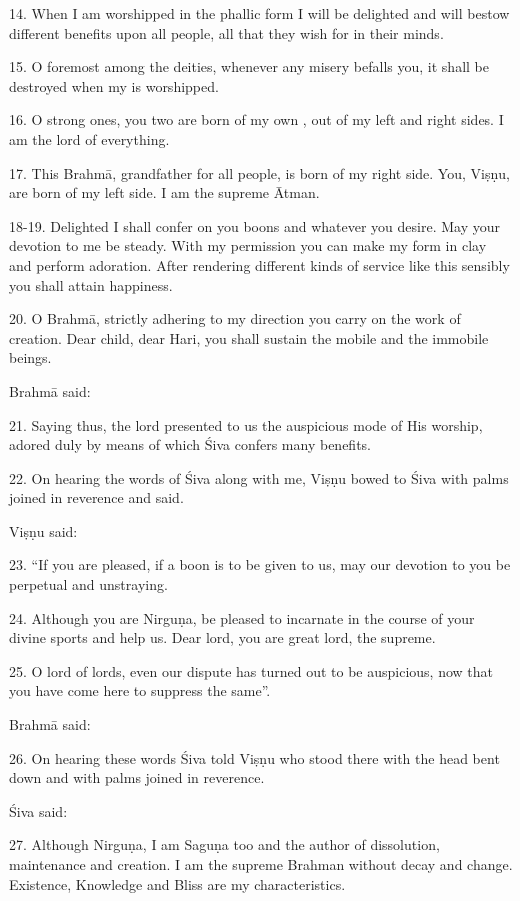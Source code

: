 14. When I am worshipped in the phallic form I will be delighted and will bestow
different benefits upon all people, all that they wish for in their minds.

15. O foremost among the deities, whenever any misery befalls you, it shall be
destroyed when my  is worshipped.

16. O strong ones, you two are born of my own , out of my left and
right sides. I am the lord of everything.

17. This Brahmā, grandfather for all people, is born of my right side. You,
Viṣṇu, are born of my left side. I am the supreme Ātman.

18-19. Delighted I shall confer on you boons and whatever you desire. May your
devotion to me be steady. With my permission you can make my form in clay and
perform adoration. After rendering different kinds of service like this sensibly
you shall attain happiness.

20. O Brahmā, strictly adhering to my direction you carry on the work of
creation. Dear child, dear Hari, you shall sustain the mobile and the immobile
beings.

Brahmā said:

21. Saying thus, the lord presented to us the auspicious mode of His worship,
adored duly by means of which Śiva confers many benefits.

22. On hearing the words of Śiva along with me, Viṣṇu bowed to Śiva with palms
joined in reverence and said.

Viṣṇu said:

23. “If you are pleased, if a boon is to be given to us, may our devotion to you
be perpetual and unstraying.

24. Although you are Nirguṇa, be pleased to incarnate in the course of your
divine sports and help us. Dear lord, you are great lord, the supreme.

25. O lord of lords, even our dispute has turned out to be auspicious, now that
you have come here to suppress the same”.

Brahmā said:

26. On hearing these words Śiva told Viṣṇu who stood there with the head bent
down and with palms joined in reverence.

Śiva said:

27. Although Nirguṇa, I am Saguṇa too and the author of dissolution, maintenance
and creation. I am the supreme Brahman without decay and change. Existence,
Knowledge and Bliss are my characteristics.

